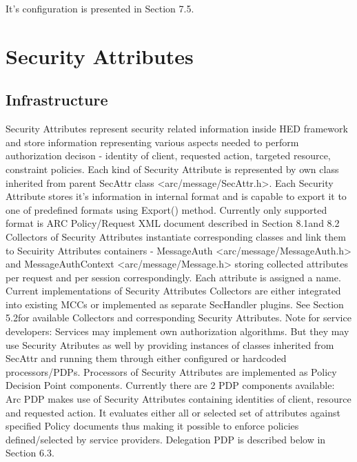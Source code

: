 \documentclass{book}
\begin{document}
It's configuration is presented in Section 7.5. 



\section{Security Attributes} %
\label{sec:sec_attributes}

\subsection{Infrastructure} %
\label{subsec:sec_attr_infrastructure}

Security Attributes represent security related information inside HED framework and store information representing various aspects needed to perform authorization decison - identity of client, requested action, targeted resource, constraint policies. 
Each kind of Security Attribute is represented by own class inherited from parent SecAttr class <arc/message/SecAttr.h>. Each Security Attribute stores it's information in internal format and is capable to export it to one of predefined formats using Export() method. Currently only supported format is ARC Policy/Request XML document described in Section 8.1and 8.2
Collectors of Security Attributes instantiate corresponding classes and link them to Secuirity Attributes containers - MessageAuth <arc/message/MessageAuth.h> and MessageAuthContext <arc/message/Message.h> storing collected attributes per request and per session correspondingly. Each attribute is assigned a name. Current implementations of Security Attributes Collectors are either integrated into existing MCCs or implemented as separate SecHandler plugins. See Section 5.2for available Collectors and corresponding Security Attributes. 
Note for service developers: Services may implement own authorization algorithms. But they may use Security Atributes as well by providing instances of classes inherited from SecAttr and running them through either configured or hardcoded processors/PDPs.
Processors of Security Attributes are implemented as Policy Decision Point components. Currently there are 2 PDP components available:
Arc PDP makes use of Security Attributes containing identities of client, resource and requested action. It evaluates either all or selected set of attributes against specified Policy documents thus making it possible to enforce policies defined/selected by service providers. 
Delegation PDP is described below in Section 6.3.
\end{document}
